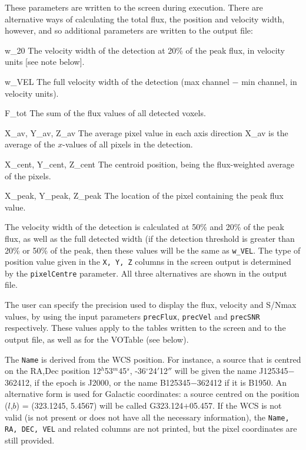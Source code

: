 These parameters are written to the screen during execution. There are
alternative ways of calculating the total flux, the position and
velocity width, however, and so additional parameters are written to
the output file:
\begin{Lentry}
\item[{w\_20}] The velocity width of the detection at 20\% of the peak
  flux, in velocity units [see note below].
\item[{w\_VEL}] The full velocity width of the detection (max channel
  $-$ min channel, in velocity units).
\item[{F\_tot}] The sum of the flux values of all detected voxels.
\item[{X\_av, Y\_av, Z\_av}] The average pixel value in each
  axis direction \ie X\_av is the average of the $x$-values of all
  pixels in the detection.
\item[{X\_cent, Y\_cent, Z\_cent}] The centroid position, being
  the flux-weighted average of the pixels.
\item[{X\_peak, Y\_peak, Z\_peak}] The location of the pixel
  containing the peak flux value.
\end{Lentry}

The velocity width of the detection is calculated at 50\% and 20\% of
the peak flux, as well as the full detected width (if the detection
threshold is greater than 20\% or 50\% of the peak, then these values
will be the same as \texttt{w\_VEL}. The type of position value given
in the \texttt{X, Y, Z} columns in the screen output is determined by
the \texttt{pixelCentre} parameter. All three alternatives are shown
in the output file.

The user can specify the precision used to display the flux, velocity
and S/Nmax values, by using the input parameters \texttt{precFlux},
\texttt{precVel} and \texttt{precSNR} respectively. These values apply
to the tables written to the screen and to the output file, as well as
for the VOTable (see below).

The \texttt{Name} is derived from the WCS position. For instance, a
source that is centred on the RA,Dec position 12$^h$53$^m$45$^s$,
-36$^\circ$24$'$12$''$ will be given the name J125345$-$362412, if the
epoch is J2000, or the name B125345$-$362412 if it is B1950. An
alternative form is used for Galactic coordinates: a source centred on
the position ($l$,$b$) = (323.1245, 5.4567) will be called
G323.124$+$05.457. If the WCS is not valid (\ie is not present or does
not have all the necessary information), the \texttt{Name, RA, DEC,
VEL} and related columns are not printed, but the pixel coordinates
are still provided.

